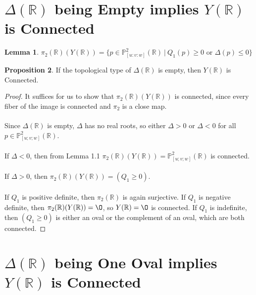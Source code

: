 \documentclass{article}
\newcommand{\Rbb}{\mathbb{R}}
\newcommand{\Pbb}{\mathbb{P}}
\begin{document}
\theoremstyle{definition}
\newtheorem{theorem}{Theorem}[section]
\theoremstyle{definition}
\newtheorem{conjecture}[theorem]{Conjecture}
\theoremstyle{definition}
\newtheorem{definition}[theorem]{Definition}
\theoremstyle{definition}
\newtheorem{goal}[theorem]{Goal}
\theoremstyle{definition}
\newtheorem{corollary}[theorem]{Corollary}
\theoremstyle{definition}
\newtheorem{question}[theorem]{Question}
\theoremstyle{definition}
\newtheorem{lemma}[theorem]{Lemma}
\theoremstyle{definition}
\newtheorem{proposition}[theorem]{Proposition}

\section{$\Delta(\Rbb)$ being Empty implies $Y(\Rbb)$ is Connected}

\begin{lemma}
$\pi_2(\Rbb)(Y(\Rbb)) = \{p \in \Pbb^2_{[u:v:w]}(\Rbb)\ |\ Q_1(p) \geq 0 \text{ or } \Delta(p) \leq 0\}$
\end{lemma}

\begin{proposition}
If the topological type of $\Delta(\Rbb)$ is empty, then $Y(\Rbb)$ is Connected.
\end{proposition}

\begin{proof}
It suffices for us to show that $\pi_2(\Rbb)(Y(\Rbb))$ is connected, since every fiber of the image is connected and $\pi_2$ is a close map.\\\\
Since $\Delta(\Rbb)$ is empty, $\Delta$ has no real roots, so either $\Delta > 0$ or $\Delta < 0$ for all $p \in \Pbb^2_{[u;v;w]}(\Rbb)$.\\\\
If $\Delta < 0$, then from Lemma 1.1 $\pi_2(\Rbb)(Y(\Rbb)) = \Pbb^2_{[u;v;w]}(\Rbb)$ is connected.\\\\
If $\Delta > 0$, then $\pi_2(\Rbb)(Y(\Rbb)) = (Q_1 \geq 0)$.\\\\
If $Q_1$ is positive definite, then $\pi_2(\Rbb)$ is again surjective. If $Q_1$ is negative definite, then $\pi_2(\Rbb)(Y(\Rbb)) = \O$, so $Y(\Rbb) = \O$ is connected. If $Q_1$ is indefinite, then $(Q_1 \geq 0)$ is either an oval or the complement of an oval, which are both connected.
\end{proof}

\section{$\Delta(\Rbb)$ being One Oval implies $Y(\Rbb)$ is Connected}
\end{document}
